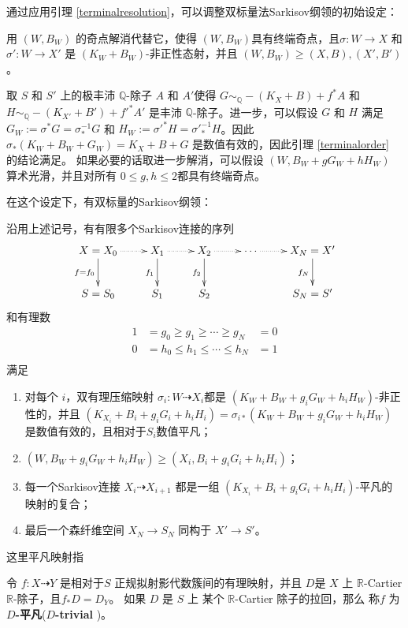 通过应用引理 \ref{terminalresolution}，可以调整双标量法Sarkisov纲领的初始设定：
\begin{assertion}\label{doublesetting}
用 $(W,B_W)$ 的奇点解消代替它，使得 $(W,B_{W})$具有终端奇点，且$\sigma:W\to X$ 和$\sigma':W\to X'$ 是 $(K_W+B_W)$-非正性态射，并且 $(W,B_W)\geqslant (X,B),(X',B')$。

  取 $ S $ 和 $ S' $ 上的极丰沛 $\mathbb{Q}$-除子 $ A $ 和 $ A' $使得 $ G\sim_{\mathbb{Q}}-(K_X+B)+f^*A $ 和 $ H\sim_{\mathbb{Q}}-(K_{X'}+B')+f'^{*}A' $ 是丰沛 $\mathbb{Q}$-除子。进一步，可以假设 $ G $ 和 $ H $ 满足 $G_{W}:= \sigma^*G=\sigma^{-1}_*G $ 和 $ H_{W}:=\sigma'^{*}H=\sigma'^{-1}_*H $。因此 $\sigma_{*}(K_{W}+B_{W}+G_{W})=K_{X}+B+G$ 是数值有效的，因此引理 \ref{terminalorder} 的结论满足。
如果必要的话取进一步解消，可以假设
 $(W, B_W+gG_W+hH_W)$ 算术光滑，并且对所有 $0\leqslant g,h\leqslant 2$都具有终端奇点。
\end{assertion}
 在这个设定下，有双标量的Sarkisov纲领：
\begin{theorem}[双标量Sarkisov纲领]\label{main2}
  \cite[Claim 13.12]{haconMinimalModelProgram2012}
  沿用上述记号，有有限多个Sarkisov连接的序列
  \[
    \xymatrix{
    X=X_0\ar@{.>}[r]\ar[d]_{f=f_{0}}&X_{1}\ar@{.>}[r]\ar[d]_{f_{1}}& X_{2}\ar[d]_{f_{2}}\ar@{.>}[r] &\cdots\ar@{.>}[r]&X_N=X'\ar[d]_{f_{N}} \\
    S=S_{0}&S_{1} &S_{2}&&S_N=S'
    }
  \]
  和有理数
  \[
    \begin{aligned}
      1 & =g_0\geqslant g_1 \geqslant \cdots \geqslant g_N   & =0 \\
      0 & =h_0\leqslant h_{1} \leqslant \cdots \leqslant h_N & =1 \\
    \end{aligned}
  \]
  满足
  \begin{enumerate}
    \item 对每个 $i$，双有理压缩映射 $\sigma_i:W\dashrightarrow  X_{i}$都是 $(K_{W}+B_{W}+g_{i}G_{W}+h_{i}H_{W})$-非正性的，并且 $(K_{X_{i}}+B_{i}+g_{i}G_{i}+h_{i}H_{i})=\sigma_{i*}(K_{W}+B_{W}+g_{i}G_{W}+h_{i}H_{W})$ 是数值有效的，且相对于$S_{i}$数值平凡；
    \item $(W,B_{W}+g_{i}G_{W}+h_{i}H_{W})\geqslant (X_{i},B_{i}+g_{i}G_{i}+h_{i}H_{i})$；
    \item 每一个Sarkisov连接 $X_{i}\dashrightarrow X_{i+1}$ 都是一组 $(K_{X_{i}}+B_{i}+g_{i}G_{i}+h_{i}H_{i})$-平凡的映射的复合；
    \item 最后一个森纤维空间 $X_{N} \to S_{N}$ 同构于 $X'\to S'$。
  \end{enumerate}
\end{theorem}
这里平凡映射指
\begin{definition}\label{trivialmap}
  \cite[\S 13.2]{haconMinimalModelProgram2012} 令 $f:X\dashrightarrow Y$ 是相对于$S$ 正规拟射影代数簇间的有理映射，并且 $D$是 $X$  上  $\mathbb{R}$-Cartier $\mathbb{R}$-除子，且$f_*D=D_Y$。   如果 $D$ 是 $S$ 上 某个  $\mathbb{R}$-Cartier 除子的拉回，那么 称$f$ 为 \textbf{$D$-平凡}(\textbf{$D$-trivial })。
\end{definition}

